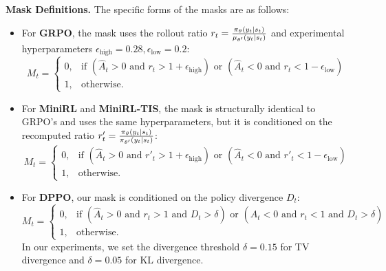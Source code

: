 \textbf{Mask Definitions.}  
The specific forms of the masks are as follows:  
\begin{itemize}  
    \item For \textbf{GRPO}, the mask uses the rollout ratio $r_t = \frac{\operatorname*{{\textcolor{black}{\pi}}}_\theta(y_t|s_t)}{\operatorname*{{\textcolor{black}{\mu}}}_{\theta'}(y_t|s_t)}$ and experimental hyperparameters $\epsilon_\text{high}=0.28, \epsilon_\text{low}=0.2$:  
    \begin{equation*}  
    M_t =  
        \begin{cases}  
            0, & \text{if } (\hat{A}_t > 0 \text{ and } r_t > 1 + \epsilon_\text{high}) \text{ or } (\hat{A}_t < 0 \text{ and } r_t < 1 - \epsilon_\text{low}) \\  
            1, & \text{otherwise}.  
        \end{cases}  
    \end{equation*}  
  
    \item For \textbf{MiniRL} and \textbf{MiniRL-TIS}, the mask is structurally identical to GRPO's and uses the same hyperparameters, but it is conditioned on the recomputed ratio $r'_t = \frac{\operatorname*{{\textcolor{black}{\pi}}}_\theta(y_t|s_t)}{\operatorname*{{\textcolor{black}{\pi}}}_{\theta'}(y_t|s_t)}$:  
    \begin{equation*}  
    M_t =  
        \begin{cases}  
            0, & \text{if } (\hat{A}_t > 0 \text{ and } r'_t > 1 + \epsilon_\text{high}) \text{ or } (\hat{A}_t < 0 \text{ and } r'_t < 1 - \epsilon_\text{low}) \\  
            1, & \text{otherwise}.  
        \end{cases}  
    \end{equation*}  
  
    \item For \textbf{DPPO}, our mask is conditioned on the policy divergence $D_t$:  
    \begin{equation*}  
    M_t =  
        \begin{cases}  
            0, & \text{if } (\hat{A}_t > 0 \text{ and } r_t > 1 \text{ and } D_t > \delta) \text{ or } (\hat{A}_t < 0 \text{ and } r_t < 1 \text{ and } D_t > \delta) \\  
            1, & \text{otherwise}.  
        \end{cases}  
    \end{equation*}  
    In our experiments, we set the divergence threshold $\delta=0.15$ for TV divergence and $\delta=0.05$ for KL divergence.  
\end{itemize}

